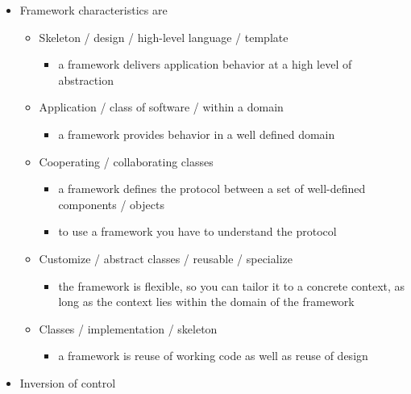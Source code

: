 \documentclass[11pt]{article}
\providecommand{\tightlist}{%
      \setlength{\itemsep}{0pt}\setlength{\parskip}{0pt}}
\begin{document}
\begin{itemize}
\tightlist
\item
  Framework characteristics are

  \begin{itemize}
  \tightlist
  \item
    Skeleton / design / high-level language / template

    \begin{itemize}
    \tightlist
    \item
      a framework delivers application behavior at a high level of
      abstraction
    \end{itemize}
  \item
    Application / class of software / within a domain

    \begin{itemize}
    \tightlist
    \item
      a framework provides behavior in a well defined domain
    \end{itemize}
  \item
    Cooperating / collaborating classes

    \begin{itemize}
    \tightlist
    \item
      a framework defines the protocol between a set of well-defined
      components / objects
    \item
      to use a framework you have to understand the protocol
    \end{itemize}
  \item
    Customize / abstract classes / reusable / specialize

    \begin{itemize}
    \tightlist
    \item
      the framework is flexible, so you can tailor it to a concrete
      context, as long as the context lies within the domain of the
      framework
    \end{itemize}
  \item
    Classes / implementation / skeleton

    \begin{itemize}
    \tightlist
    \item
      a framework is reuse of working code as well as reuse of design
    \end{itemize}
  \end{itemize}
\item
  Inversion of control


\end{itemize}
\end{document}
